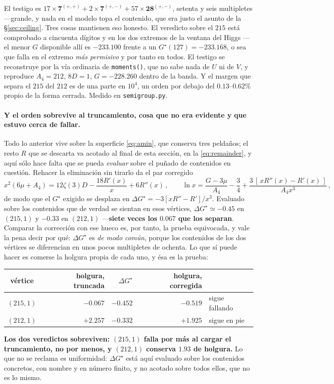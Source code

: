 \documentclass[11pt,a4paper]{article}
\newcommand{\rep}[1]{\mathbf{#1}}
\begin{document}
\noindent El testigo es
$17\times\rep7^{(+,+)}+2\times\rep7^{(+,-)}+57\times\rep{28}^{(+,-)}$, setenta y seis multipletes
---grande, y nada en el modelo topa el contenido, que era justo el asunto de la
\S\ref{sec:ceiling}. Tres cosas mantienen eso honesto. El veredicto sobre el $215$ está comprobado a cincuenta
dígitos y en los dos extremos de la ventana del Higgs ---el menor $G$ disponible allí es $-233.100$
frente a un $G^\star(127)=-233.168$, o sea que falla en el extremo \emph{más permisivo} y por tanto
en todos. El testigo se reconstruye por la vía ordinaria de \texttt{moments()}, que no sabe nada de
$U$ ni de $V$, y reproduce $A_4=212$, $8D=1$, $G=-228.260$ dentro de la banda. Y el margen que
separa el $215$ del $212$ es de una parte en $10^{4}$, un orden por debajo del $0.13$--$0.62\%$
propio de la forma cerrada. Medido en \texttt{semigroup.py}.

\paragraph{Y el orden sobrevive al truncamiento, cosa que no era evidente y que estuvo cerca de
fallar.} Todo lo anterior vive sobre la superficie \eqref{eq:amin}, que conserva tres peldaños; el
resto $R$ que se descarta va acotado al final de esta sección, en la \eqref{eq:remainder}, y aquí
sólo hace falta que se pueda \emph{evaluar} sobre el puñado de contenidos en cuestión. Rehacer la
eliminación sin tirarlo da el par corregido
\begin{equation}\label{eq:corrected}
  x^2(6\mu+A_4)=12\zeta(3)D-\frac{18R'(x)}{x}+6R''(x)\,,\qquad
  \ln x=\frac{G-3\mu}{A_4}-\frac34+\frac{3\,[\,xR''(x)-R'(x)\,]}{A_4x^3}\,,
\end{equation}
de modo que el $G^\star$ exigido se desplaza en $\Delta G^\star=-3[xR''-R']/x^3$. Evaluado sobre los
contenidos que de verdad se sientan en esos vértices, $\Delta G^\star\simeq-0.45$ en $(215,1)$ y
$-0.33$ en $(212,1)$ ---\textbf{siete veces los $0.067$ que los separan}. Comparar la corrección con
ese hueco es, por tanto, la prueba equivocada, y vale la pena decir por qué: $\Delta G^\star$ es
\emph{de modo común}, porque los contenidos de los dos vértices se diferencian en unos pocos
multipletes de ochenta. Lo que sí puede hacer es comerse la holgura propia de cada uno, y ésa es la
prueba:
\begin{center}\small
\begin{tabular}{crrrl}
\toprule
\rowcolor{hdrblue!10}vértice & holgura, truncada & $\Delta G^\star$ & holgura, corregida & \\
\midrule
\rowcolor{warmred!14}$(215,1)$ & $-0.067$ & $-0.452$ & $-0.519$ & sigue fallando\\
$(212,1)$ & $+2.257$ & $-0.332$ & $+1.925$ & sigue en pie\\
\bottomrule
\end{tabular}
\end{center}
\noindent \textbf{Los dos veredictos sobreviven: $(215,1)$ falla por más al cargar el truncamiento,
no por menos, y $(212,1)$ conserva $1.93$ de holgura.} Lo que no se reclama es uniformidad:
$\Delta G^\star$ está aquí evaluado sobre los contenidos concretos, con nombre y en número finito,
y no acotado sobre todos ellos, que no es lo mismo.
\end{document}
